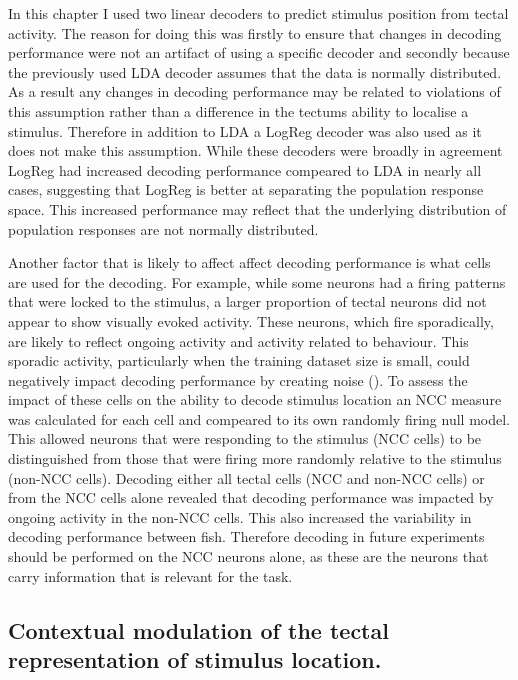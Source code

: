 In this chapter I used two linear decoders to predict stimulus position from tectal activity. The reason for doing this was firstly to ensure that changes in decoding performance were not an artifact of using a specific decoder and secondly because the previously used LDA decoder assumes that the data is normally distributed. As a result any changes in decoding performance may be related to violations of this assumption rather than a difference in the tectums ability to localise a stimulus. Therefore in addition to LDA a LogReg decoder was also used as it does not make this assumption. While these decoders were broadly in agreement LogReg had increased decoding performance compeared to LDA in nearly all cases, suggesting that LogReg is better at separating the population response space. This increased performance may reflect that the underlying distribution of population responses are not normally distributed.

Another factor that is likely to affect affect decoding performance is what cells are used for the decoding. For example, while some neurons had a firing patterns that were locked to the stimulus, a larger proportion of tectal neurons did not appear to show visually evoked activity. These neurons, which fire sporadically, are likely to reflect ongoing activity and activity related to behaviour. This sporadic activity, particularly when the training dataset size is small, could negatively impact decoding performance by creating noise (\cite{Kahn2015ANeurons}). To assess the impact of these cells on the ability to decode stimulus location an NCC measure was calculated for each cell and compeared to its own randomly firing null model. This allowed neurons that were responding to the stimulus (NCC cells) to be distinguished from those that were firing more randomly relative to the stimulus (non-NCC cells). Decoding either all tectal cells (NCC and non-NCC cells) or from the NCC cells alone revealed that decoding performance was impacted by ongoing activity in the non-NCC cells. This also increased the variability in decoding performance between fish. Therefore decoding in future experiments should be performed on the NCC neurons alone, as these are the neurons that carry information that is relevant for the task.

\subsection{Contextual modulation of the tectal representation of stimulus location.}


